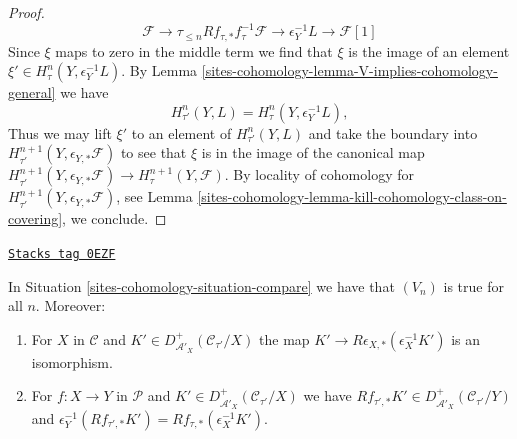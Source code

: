 \begin{proof}
$$
\mathcal{F} \to \tau_{\leq n}Rf_{\tau, *}f_\tau^{-1}\mathcal{F}
\to \epsilon_Y^{-1}L \to \mathcal{F}[1]
$$
Since $\xi$ maps to zero in the middle term we find
that $\xi$ is the image of an element
$\xi' \in H^n_\tau(Y, \epsilon_Y^{-1}L)$.
By Lemma \ref{sites-cohomology-lemma-V-implies-cohomology-general} we have
$$
H^n_{\tau'}(Y, L) = H^n_\tau(Y, \epsilon_Y^{-1}L),
$$
Thus we may lift $\xi'$ to an element of $H^n_{\tau'}(Y, L)$
and take the boundary into
$H^{n + 1}_{\tau'}(Y, \epsilon_{Y, *}\mathcal{F})$
to see that $\xi$ is in the image of the canonical map
$H^{n + 1}_{\tau'}(Y, \epsilon_{Y, *}\mathcal{F}) \to
H^{n + 1}_\tau(Y, \mathcal{F})$.
By locality of cohomology for
$H^{n + 1}_{\tau'}(Y,\epsilon_{Y, *}\mathcal{F})$, see
Lemma \ref{sites-cohomology-lemma-kill-cohomology-class-on-covering},
we conclude.
\end{proof}

\begin{lemma}
\label{sites-cohomology-lemma-V-C-all-n-general}
\href{https://stacks.math.columbia.edu/tag/0EZF}{\texttt{Stacks tag 0EZF}}

In Situation \ref{sites-cohomology-situation-compare} we have that
$(V_n)$ is true for all $n$. Moreover:
\begin{enumerate}
\item For $X$ in $\mathcal{C}$ and
$K' \in D^+_{\mathcal{A}'_X}(\mathcal{C}_{\tau'}/X)$ the map
$K' \to R\epsilon_{X, *}(\epsilon_X^{-1}K')$ is an isomorphism.
\item For $f : X \to Y$ in $\mathcal{P}$ and
$K' \in D^+_{\mathcal{A}'_X}(\mathcal{C}_{\tau'}/X)$ we have
$Rf_{\tau', *}K' \in D^+_{\mathcal{A}'_X}(\mathcal{C}_{\tau'}/Y)$ and
$\epsilon_Y^{-1}(Rf_{\tau', *}K') = Rf_{\tau, *}(\epsilon_X^{-1}K')$.
\end{enumerate}
\end{lemma}

